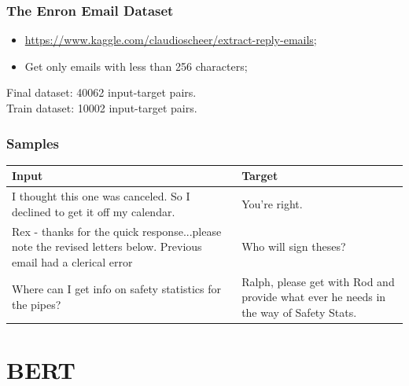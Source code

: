 \documentclass{beamer}
\begin{document}
\begin{frame}
  \frametitle{The Enron Email Dataset}

  \begin{itemize}
    \item \href{https://www.kaggle.com/claudioscheer/extract-reply-emails}{https://www.kaggle.com/claudioscheer/extract-reply-emails};
    \item Get only emails with less than 256 characters;
  \end{itemize}

  \bigbreak
  \bigbreak
  \bigbreak

  Final dataset: \num{40062} input-target pairs.
  \\
  Train dataset: \num{10002} input-target pairs.
\end{frame}

\begin{frame}
  \frametitle{Samples}

  \begin{table}
    \centering
    \begin{tabularx}{\textwidth}{|X|X|}
      \hline
      \textbf{Input}                                                            & \textbf{Target}                                                                       \\
      \hline
      I thought this one was canceled. So I declined to get it off my calendar. & You're right.                                                                         \\
      \hline
      Rex - thanks for the quick response...please note the revised letters below.
      Previous email had a clerical error                                       & Who will sign theses?                                                                 \\
      \hline
      Where can I get info on safety statistics for the pipes?                  & Ralph, please get with Rod and provide what ever he needs in the way of Safety Stats. \\
      \hline
    \end{tabularx}
  \end{table}
\end{frame}


\section{BERT}
\end{document}

